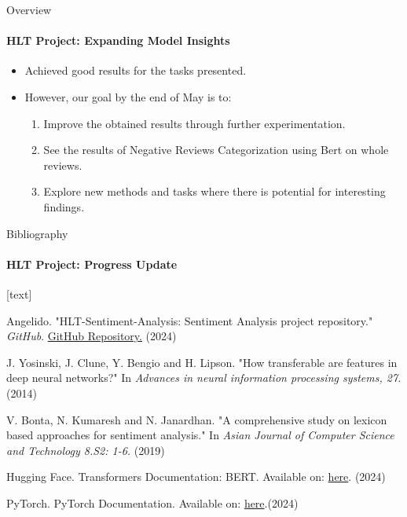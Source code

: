 \documentclass{beamer}
\theoremstyle{definition}
\theoremstyle{plain}
\begin{document}
\begin{frame}{Overview}
\framesubtitle{HLT Project: Expanding Model Insights}
{\small
\begin{itemize}
    \item Achieved good results for the tasks presented.
    \item However, our goal by the end of May is to:
    \begin{enumerate}
        \item Improve the obtained results through further experimentation.
        \item See the results of Negative Reviews Categorization using Bert on whole reviews.
        \item Explore new methods and tasks where there is potential for interesting findings.
    \end{enumerate}
\end{itemize}
}
\end{frame}


\begin{frame}{Bibliography}
\framesubtitle{HLT Project: Progress Update}

\begin{thebibliography}{9}
[text]
{\small

 Angelido. "HLT-Sentiment-Analysis: Sentiment Analysis project repository." \emph{GitHub}. \href{https://github.com/Angelido/HLT-Sentiment-Analysis}{GitHub Repository.} (2024)

 J. Yosinski, J. Clune, Y. Bengio and H. Lipson. "How transferable are features in deep neural networks?" In \emph{Advances in neural information processing systems, 27.} (2014)

 V. Bonta, N. Kumaresh and N. Janardhan. "A comprehensive study on lexicon based approaches for sentiment analysis." In \emph{Asian Journal of Computer Science and Technology 8.S2: 1-6.} (2019)

 Hugging Face. Transformers Documentation: BERT. Available on: \href{https://huggingface.co/docs/transformers/model_doc/bert.}{here}. (2024)

 PyTorch. PyTorch Documentation. Available on: \href{https://pytorch.org/docs/stable/index.html}{here}.(2024)
}

\end{thebibliography}
    
\end{frame}

\backmatter
\end{document}
